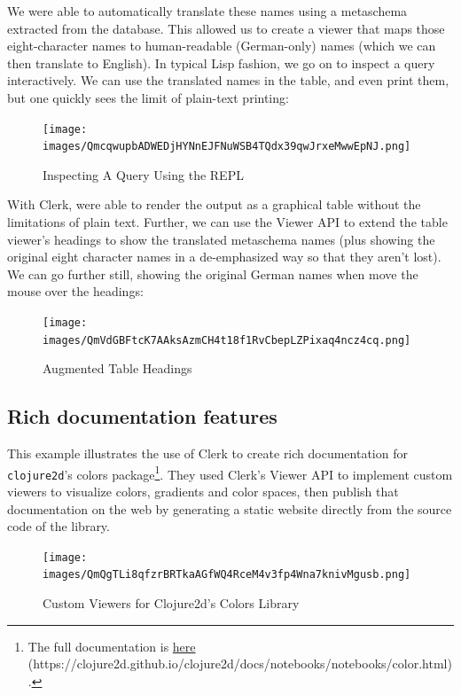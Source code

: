 \documentclass[sigconf,screen]{acmart}
\newcommand{\passthrough}[1]{#1}
\begin{document}
We were able to automatically translate these names using a metaschema extracted from the database. This allowed us to create a viewer that maps those eight-character names to human-readable (German-only) names (which we can then translate to English). In typical Lisp fashion, we go on to inspect a query interactively. We can use the translated names in the table, and even print them, but one quickly sees the limit of plain-text printing:

\begin{figure}
\hypertarget{inspecting-a-query-using-the-repl}{%
\centering
\texttt{[image: images/QmcqwupbADWEDjHYNnEJFNuWSB4TQdx39qwJrxeMwwEpNJ.png]}
\caption{Inspecting A Query Using the REPL}\label{inspecting-a-query-using-the-repl}
}
\end{figure}

With Clerk, were able to render the output as a graphical table without the limitations of plain text. Further, we can use the Viewer API to extend the table viewer's headings to show the translated metaschema names (plus showing the original eight character names in a de-emphasized way so that they aren't lost). We can go further still, showing the original German names when move the mouse over the headings:

\begin{figure}
\hypertarget{augmented-table-headings}{%
\centering
\texttt{[image: images/QmVdGBFtcK7AAksAzmCH4t18f1RvCbepLZPixaq4ncz4cq.png]}
\caption{Augmented Table Headings}\label{augmented-table-headings}
}
\end{figure}

\hypertarget{rich-documentation-features}{%
\subsection{Rich documentation features}\label{rich-documentation-features}}

This example illustrates the use of Clerk to create rich documentation for \passthrough{\lstinline!clojure2d!}'s colors package\footnote{The full documentation is {\href{https://clojure2d.github.io/clojure2d/docs/notebooks/notebooks/color.html}{here} (https://clojure2d.github.io/clojure2d/docs/notebooks/notebooks/color.html)}.}. They used Clerk's Viewer API to implement custom viewers to visualize colors, gradients and color spaces, then publish that documentation on the web by generating a static website directly from the source code of the library.

\begin{figure}
\hypertarget{custom-viewers-for-clojure2ds-colors-library}{%
\centering
\texttt{[image: images/QmQgTLi8qfzrBRTkaAGfWQ4RceM4v3fp4Wna7knivMgusb.png]}
\caption{Custom Viewers for Clojure2d's Colors Library}\label{custom-viewers-for-clojure2ds-colors-library}
}
\end{figure}
\end{document}
